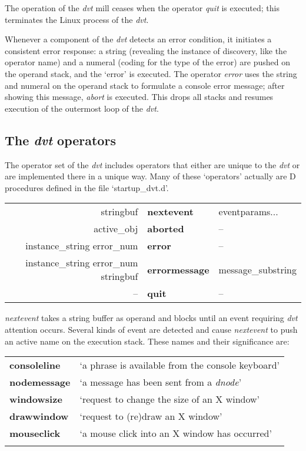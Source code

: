 The  operation of the \emph{dvt} mill ceases when  the operator \emph{quit} is executed; this terminates the Linux process of the \emph{dvt}.

Whenever a component of the \emph{dvt} detects an error condition, it initiates a consistent error response: a string (revealing the instance of discovery, like the operator name) and a numeral (coding for the type of the error) are pushed on the operand stack, and the `error' is executed. The operator \emph{error} uses the string and numeral on the operand stack to formulate a console error message; after showing this message, \emph{abort} is executed. This drops all stacks and resumes execution of the outermost loop of the \emph{dvt}.



\subsection{The \emph{dvt} operators}\label{ssec:dvtops}

The operator set of the \emph{dvt} includes operators that either are unique to the \emph{dvt} or are implemented there in a unique way. Many of these `operators' actually are D procedures defined in the file `startup\_dvt.d'.\\

\begin{tabular}{>{\sffamily}r>{\sffamily\bfseries}l>{\sffamily}l}
  stringbuf & nextevent & eventparams...\\
  active\_obj & aborted & --\\
  instance\_string error\_num & error & --\\
  instance\_string error\_num stringbuf & errormessage & message\_substring\\
  -- & quit & --\\
\end{tabular}


\noindent \emph{nextevent} takes a string buffer as operand and blocks until an event requiring \emph{dvt} attention occurs. Several kinds of event are detected and cause \emph{nextevent} to push an active name on the execution stack. These names and their significance are:\\

\begin{tabular}{>{\sffamily\bfseries}l>{\sffamily}l}
  consoleline & `a phrase is available from the console keyboard'\\
  nodemessage & `a message has been sent from a \emph{dnode}'\\
  windowsize  & `request to change the size of an X window'\\
  drawwindow  & `request to (re)draw an X window'\\
  mouseclick  & `a mouse click into an X window has occurred'\\\\
\end{tabular}

